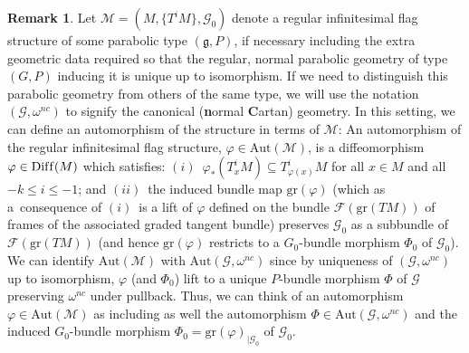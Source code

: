 \documentclass[pdftex]{sigma}
\def\g{\mathfrak{g}}
\def\Gbdle{\mathcal{G}}
\theoremstyle{plain}
\theoremstyle{definition}
\newtheorem{Remark}[Definition]{Remark}
\begin{document}
\begin{Remark} \label{underlying automorphisms} Let $\mathcal{M} = (M,\{T^iM\},\Gbdle_0)$ denote a regular inf\/initesimal f\/lag structure of some parabolic type $(\g,P)$, if necessary including the extra geometric data required so that the regular, normal parabolic geometry of type $(G,P)$ inducing it is unique up to isomorphism. If we need to distinguish this parabolic geometry from others of the same type, we will use the notation $(\Gbdle,\omega^{nc})$ to signify the canonical (\textbf{n}ormal \textbf{C}artan) geometry. In this setting, we can def\/ine an automorphism of the structure in terms of $\mathcal{M}$: An automorphism of the regular inf\/initesimal f\/lag structure, $\varphi \in \mathrm{Aut}(\mathcal{M})$, is a dif\/feomorphism $\varphi \in \mathrm{Dif\/f}(M)$ which satisf\/ies: $(i)$~$\varphi_*(T_x^iM) \subseteq T_{\varphi(x)}^iM$ for all $x \in M$ and all $-k \leq i \leq -1$; and $(ii)$~the induced bundle map $\mathrm{gr}(\varphi)$ (which as a~consequence of $(i)$~is a lift of $\varphi$ def\/ined on the bundle $\mathcal{F}(\mathrm{gr}(TM))$ of frames of the associated graded tangent bundle) preserves $\Gbdle_0$ as a subbundle of $\mathcal{F}(\mathrm{gr}(TM))$ (and hence $\mathrm{gr}(\varphi)$ restricts to a $G_0$-bundle morphism $\Phi_0$ of $\Gbdle_0$). We can identify $\mathrm{Aut}(\mathcal{M})$ with $\mathrm{Aut}(\Gbdle,\omega^{nc})$ since by uniqueness of $(\Gbdle,\omega^{nc})$ up to isomorphism, $\varphi$ (and $\Phi_0$) lift to a unique $P$-bundle morphism $\Phi$ of $\Gbdle$ preserving $\omega^{nc}$ under pullback. Thus, we can think of an automorphism $\varphi \in \mathrm{Aut}(\mathcal{M})$ as including as well the automorphism $\Phi \in \mathrm{Aut}(\Gbdle,\omega^{nc})$ and the induced $G_0$-bundle morphism $\Phi_0 = \mathrm{gr}(\varphi)_{\vert \Gbdle_0}$ of $\Gbdle_0$.
\end{Remark}
\end{document}
